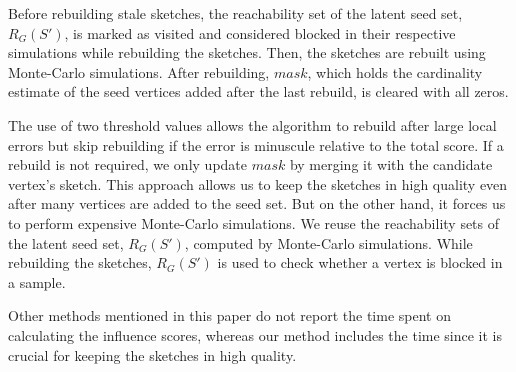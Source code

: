\documentclass[10pt,journal,compsoc]{IEEEtran}
\begin{document}
Before rebuilding stale sketches, the reachability set of the latent seed set, $R_G(S')$, is marked as visited and considered blocked in their respective simulations while rebuilding the sketches. Then, the sketches are rebuilt using Monte-Carlo simulations. After rebuilding, $mask$, which holds the cardinality estimate of the seed vertices added after the last rebuild, is cleared with all zeros.

The use of two threshold values allows the algorithm to rebuild after large local errors but skip rebuilding if the error is minuscule relative to the total score. 
If a rebuild is not required, we only update $mask$ by merging it with the candidate vertex's sketch. 
This approach allows us to keep the sketches in high quality even after many vertices are added to the seed set. But on the other hand, it forces us to perform expensive Monte-Carlo simulations. 
We reuse the reachability sets of the latent seed set, $R_G(S')$, computed by Monte-Carlo simulations. While rebuilding the sketches, $R_G(S')$ is used to check whether a vertex is blocked in a sample.

Other methods mentioned in this paper do not report the time spent on calculating the influence scores, 
whereas our method includes the time since it is crucial for keeping the sketches in high quality.
\end{document}
